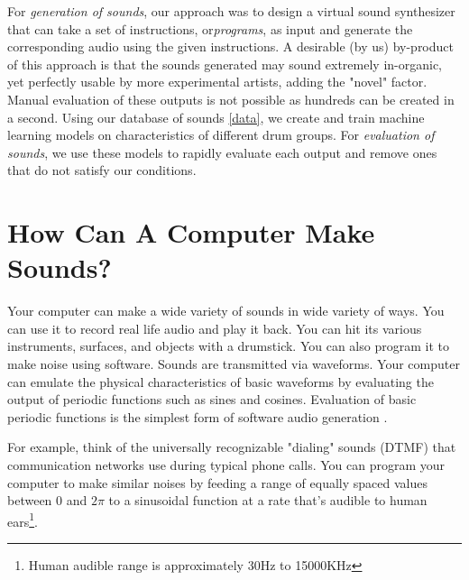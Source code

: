 \documentclass[\main/thesis.tex]{subfiles}
\begin{document}
For \textit{generation of sounds}, our approach was to design a virtual sound synthesizer that can take a set of instructions, or\textit{programs}, as input and generate the corresponding audio using the given instructions. A desirable (by us) by-product of this approach is that the sounds generated may sound extremely in-organic, yet perfectly usable by more experimental artists, adding the "novel" factor. 
Manual evaluation of these outputs is not possible as hundreds can be created in a second. Using our database of sounds \ref{data}, we create and train machine learning models on characteristics of different drum groups. For \textit{evaluation of sounds}, we use these models to rapidly evaluate each output and remove ones that do not satisfy our conditions.


\section{How Can A Computer Make Sounds?}
Your computer can make a wide variety of sounds in wide variety of ways. You can use it to record real life audio and play it back. You can hit its various instruments, surfaces, and objects with a drumstick. You can also program it to make noise using software.
Sounds are transmitted via waveforms. Your computer can emulate the physical characteristics of basic waveforms by evaluating the output of periodic functions such as sines and cosines. Evaluation of basic periodic functions is the simplest form of software audio generation \cite[chapter~5]{mitchell2009basicsynth}.

For example, think of the universally recognizable "dialing" sounds (DTMF) that communication networks use during typical phone calls. You can program your computer to make similar noises by feeding a range of equally spaced values between 0 and $2\pi$ to a sinusoidal function at a rate that's audible to human ears\footnote{Human audible range is approximately 30Hz to 15000KHz}. 
\end{document}
